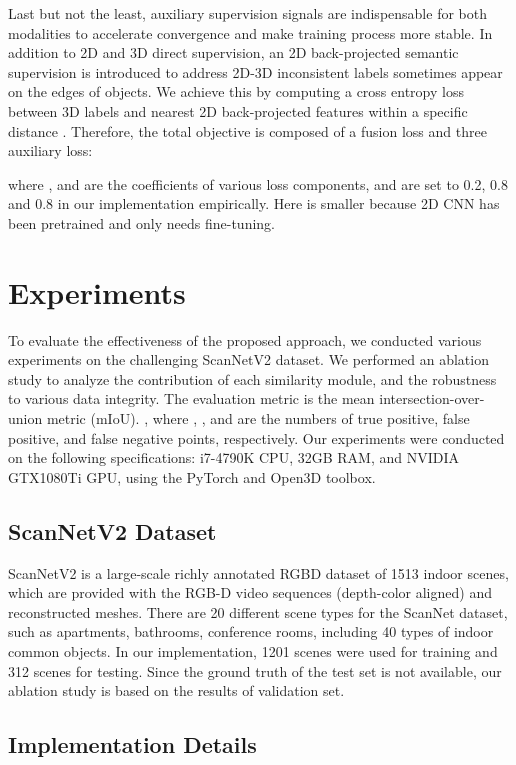 \documentclass[letterpaper, 10 pt, conference]{ieeeconf}
\begin{document}
Last but not the least, auxiliary supervision signals are indispensable for both modalities to accelerate convergence and make training process more stable. In addition to 2D and 3D direct supervision, an 2D back-projected semantic supervision is introduced to address 2D-3D inconsistent labels sometimes appear on the edges of objects. We achieve this by computing a cross entropy loss  between 3D labels and nearest 2D back-projected features within a specific distance . Therefore, the total objective is composed of a fusion loss and three auxiliary loss:

where ,  and  are the coefficients of various loss components, and are set to 0.2, 0.8 and 0.8 in our implementation empirically. Here  is smaller because 2D CNN has been pretrained and only needs fine-tuning.



\section{Experiments}
To evaluate the effectiveness of the proposed approach, we conducted various experiments on the challenging ScanNetV2 dataset\cite{dai2017scannet}. We performed an ablation study to analyze the contribution of each similarity module, and the robustness to various data integrity. The evaluation metric is the mean intersection-over-union metric (mIoU). , where , , and  are the numbers of true positive, false positive, and false negative points, respectively. Our experiments were conducted on the following specifications:
i7-4790K CPU, 32GB RAM, and NVIDIA GTX1080Ti GPU, using the PyTorch and Open3D \cite{Zhou2018} toolbox.




\subsection{ScanNetV2 Dataset}
ScanNetV2 is a large-scale richly annotated RGBD dataset of 1513 indoor scenes, which are provided with the RGB-D video sequences (depth-color aligned) and reconstructed meshes. There are 20 different scene types for the ScanNet dataset, such as apartments, bathrooms, conference rooms, including 40 types of indoor common objects. In our implementation, 1201 scenes were used for training and 312 scenes for testing. Since the ground truth of the test set is not available, our ablation study is based on the results of validation set.

\subsection{Implementation Details}
\end{document}
